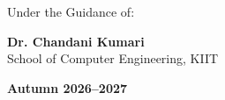 \documentclass[12pt,a4paper]{article}
\begin{document}
	\vspace{1.0cm}
	\vfill %
	\begin{center}
		\large
		Under the Guidance of:
		\vspace{0.3cm}
		
		\textbf{Dr. Chandani Kumari}\\
		\normalsize School of Computer Engineering, KIIT\\
	\end{center}
	
	\vspace{0.5cm}
	\begin{center}
		\large \textbf{Autumn 2026--2027}
	\end{center}
	
\end{document}
